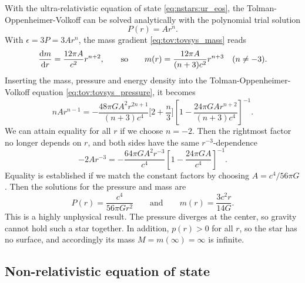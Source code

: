 With the ultra-relativistic equation of state \eqref{eq:nstars:ur_eos}, the Tolman-Oppenheimer-Volkoff can be solved analytically with the polynomial trial solution
\begin{equation}
	P(r) = A r^n .
\label{eq:nstars:ur_ansatz}
\end{equation}
With $\epsilon = 3 P = 3 A r^n$, the mass gradient \eqref{eq:tov:tovsys_mass} reads
\begin{equation}
	\odv{m}{r} = \frac{12 \pi A}{c^2} r^{n+2},
	\qquad \text{so} \qquad
	m(r) = \frac{12 \pi A}{(n+3) c^2} r^{n+3}
	\quad (n \neq -3).
\label{eq:nstars:ur_mass}
\end{equation}
Inserting the mass, pressure and energy density into the Tolman-Oppenheimer-Volkoff equation \eqref{eq:tov:tovsys_pressure}, it becomes
\begin{equation}
	n A r^{n-1} =
	-\frac{48 \pi G A^2 r^{2n+1}}{(n+3) c^4} \bigg[ 2 + \frac{n}{3} \bigg] \left[ 1 - \frac{24 \pi G A r^{n+2}}{(n+3) c^4} \right]^{-1} .
\end{equation}
We can attain equality for all $r$ if we choose $n = -2$.
Then the rightmost factor no longer depends on $r$, and both sides have the same $r^{-3}$-dependence
\begin{equation}
	- 2 A r^{-3} = - \frac{64 \pi G A^2 r^{-3}}{c^4} \left[ 1 - \frac{24 \pi G A}{c^4} \right]^{-1} .
\end{equation}
Equality is established if we match the constant factors by choosing $A = c^4 / 56 \pi G$.
Then the solutions for the pressure and mass are
\begin{equation}
	P(r) = \frac{c^4}{56 \pi G r^2}
	\qquad \text{and} \qquad
	m(r) = \frac{3 c^2 r}{14 G} .
\end{equation}
This is a highly unphysical result.
The pressure diverges at the center, so gravity cannot hold such a star together.
In addition, $p(r) > 0$ for all $r$, so the star has no surface, and accordingly its mass $M = m(\infty) = \infty$ is infinite.

\subsection{Non-relativistic equation of state}
\label{sec:nstars:nr_limit_solve}

